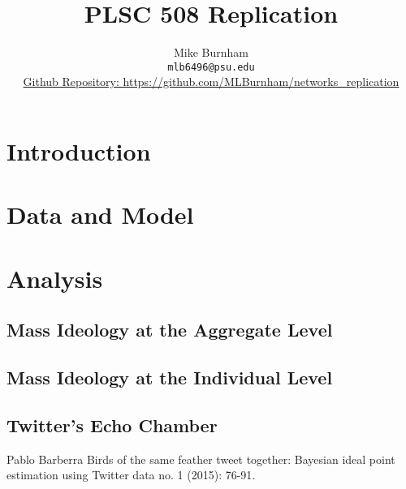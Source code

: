 \documentclass{article}
\title{PLSC 508 Replication}
\author{
  Mike Burnham \\
  \texttt{mlb6496@psu.edu} \\
  \hyperlink{https://github.com/MLBurnham/networks_replication}{Github Repository: https://github.com/MLBurnham/networks\_replication}
}
\begin{document}
\maketitle

\begin{abstract}

\end{abstract}




\section{Introduction}


\section{Data and Model}
\label{sec:headings}


\section{Analysis}



\subsection{Mass Ideology at the Aggregate Level}



\subsection{Mass Ideology at the Individual Level}


\subsection{Twitter's Echo Chamber}



  


\begin{thebibliography}{1}

Pablo Barberra
\newblock Birds of the same feather tweet together: Bayesian ideal point estimation using Twitter data
 no. 1 (2015): 76-91.

\end{thebibliography}
\end{document}
